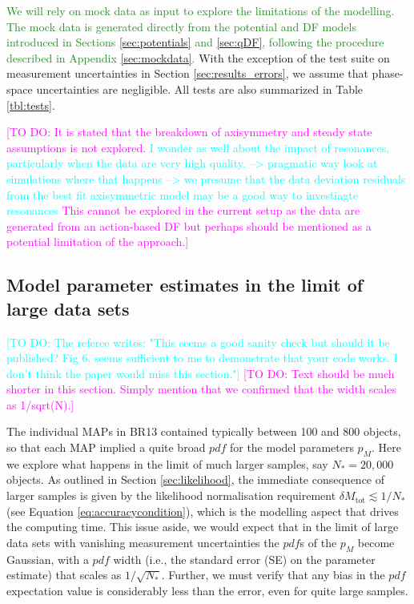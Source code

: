 \documentclass[iop,revtex4]{emulateapj}
\newcommand{\pdf}{\ensuremath{pdf}}
\newcommand{\pmodel}{\ensuremath{p_M}}
\newcommand{\MAP}{MAP}
\newcommand{\HW}[1]{\textcolor{Cyan}{#1}}
\newcommand{\NEW}[1]{\textcolor{ForestGreen}{#1}}
\newcommand{\Wilma}[1]{\textcolor{Magenta}{#1}}
\begin{document}
\NEW{We will rely on mock data as input to explore the limitations of the modelling. The mock data is generated directly from the potential and DF models introduced in Sections \ref{sec:potentials} and \ref{sec:qDF}, following the procedure described in Appendix \ref{sec:mockdata}.} With the exception of the test suite on measurement uncertainties in Section \ref{sec:results_errors}, we assume that phase-space uncertainties are negligible. All tests are also summarized in Table \ref{tbl:tests}. 

\Wilma{[TO DO: It is stated that the breakdown of axisymmetry and steady state assumptions is not explored. \HW{I wonder as well about the impact of resonances, particularly when the data are very high quality. --> pragmatic way look at simulations where that happens
--> we presume that the data deviation residuals from the best fit
axisymmetric model may be a good way to investiagte resonances
} This cannot be explored in the current setup as the data are generated from an action-based DF but perhaps should be mentioned as a potential limitation of the approach.]}

\subsection{Model parameter estimates in the limit of large data sets} \label{sec:largedata}

\HW{[TO DO: The referee writes: "This seems a good sanity check but should it be published? Fig 6. seems sufficient to me to demonstrate that your code works. I don't think the paper would miss this section."]}
\Wilma{[TO DO: Text should be much shorter in this section. Simply mention that we confirmed that the width scales as 1/sqrt(N).]}

The individual \MAP{}s in BR13 contained typically between 100 and 800 objects, so that each \MAP{} implied a quite broad \pdf{} for the model parameters $\pmodel{}$. Here we explore what happens in the limit of much larger samples, say $N_{*} = 20,000$ objects.  As outlined in Section \ref{sec:likelihood}, the immediate consequence of larger samples is given by the likelihood normalisation requirement $\delta M_\text{tot} \lesssim 1/N_{*}$ (see Equation \eqref{eq:accuracycondition}), which is the modelling aspect that drives the computing time. This issue aside, we would expect that in the limit of large data sets with vanishing measurement uncertainties the \pdf{}s of the \pmodel{} become Gaussian, with a \pdf{} width (i.e., the standard error (SE) on the parameter estimate) that scales as $1/\sqrt{N_{*}}$. Further, we must verify that any bias in the \pdf{} expectation value is considerably less than the error, even for quite large samples.
\end{document}
